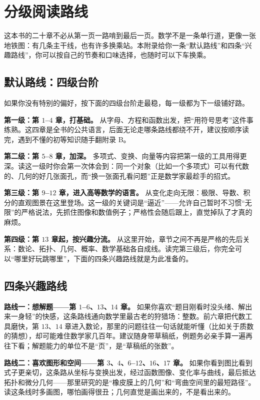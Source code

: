 \chapter{分级阅读路线}

这本书的二十章不必从第一页一路啃到最后一页。数学不是一条单行道，更像一张地铁图：有几条主干线，也有许多换乘站。本附录给你一条“默认路线”和四条“兴趣路线”，你可以按自己的节奏和口味选择，也随时可以下车换乘。

\section{默认路线：四级台阶}

如果你没有特别的偏好，按下面的四级台阶走最稳，每一级都为下一级铺好路。

\textbf{第一级：第 $1$–$4$ 章，打基础。} 从字母、方程和函数出发，把“用符号思考”这件事练熟。这四章是全书的公共语言，后面无论走哪条路线都绕不开，建议按顺序读完，遇到不懂的初等知识随手翻附录 B。

\textbf{第二级：第 $5$–$8$ 章，加深。} 多项式、变换、向量等内容把第一级的工具用得更深。读这一级时你会第一次体会到：同一个对象（比如一个多项式）可以有代数的、几何的好几张面孔，而“换一张面孔看问题”正是数学家最趁手的招式。

\textbf{第三级：第 $9$–$12$ 章，进入高等数学的语言。} 从变化走向无限：极限、导数、积分的直观图景在这里登场。这一级的关键词是“逼近”——允许自己暂时不习惯“无限”的严格说法，先抓住图像和数值例子；严格性会随后跟上，直觉掉队了才真的麻烦。

\textbf{第四级：第 $13$ 章起，按兴趣分流。} 从这里开始，章节之间不再是严格的先后关系：数论、拓扑、几何、概率、数学基础各自成线。读完第三级后，你完全可以“哪里好玩跳哪里”，下面的四条兴趣路线就是为此准备的。

\section{四条兴趣路线}

\textbf{路线一：想解题——第 $1$–$6$、$13$、$14$ 章。} 如果你喜欢“题目刚看时没头绪、解出来一身轻”的快感，这条路线通向数学里最古老的狩猎场：整数。前六章把代数工具磨快，第 $13$、$14$ 章进入数论，那里的问题往往一句话就能听懂（比如关于质数的猜想），却可能难住数学家几百年。建议随身带草稿纸，例题务必亲手算一遍再往下看；解题能力的单位不是“页”，是“草稿纸的张数”。

\textbf{路线二：喜欢图形和空间——第 $3$、$4$、$6$–$12$、$16$、$17$ 章。} 如果你看到图比看到式子更亲切，这条路从坐标与变换出发，经过函数图像、变化率与曲线，最后抵达拓扑和微分几何——那里研究的是“橡皮膜上的几何”和“弯曲空间里的最短路径”。读这条线时多画图，哪怕画得很丑；几何直觉是画出来的，不是看出来的。

